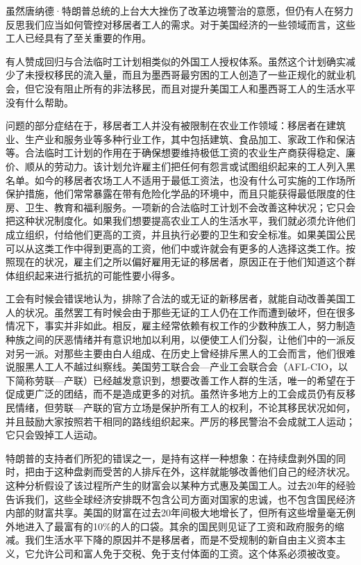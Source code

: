 \documentclass[fontset=fandol, a4paper, 12pt, openright]{ctexbook}
\begin{document}
虽然唐纳德·特朗普总统的上台大大挫伤了改革边境警治的意愿，但仍有人在努力反思我们应当如何管控对移居者工人的需求。对于美国经济的一些领域而言，这些工人已经具有了至关重要的作用。

有人赞成回归与合法临时工计划相类似的外国工人授权体系。虽然这个计划确实减少了未授权移民的流入量，而且为墨西哥最穷困的工人创造了一些正规化的就业机会，但它没有阻止所有的非法移民，而且对提升美国工人和墨西哥工人的生活水平没有什么帮助。

问题的部分症结在于，移居者工人并没有被限制在农业工作领域：移居者在建筑业、生产业和服务业等多种行业工作，其中包括建筑、食品加工、家政工作和保洁等。合法临时工计划的作用在于确保想要维持极低工资的农业生产商获得稳定、廉价、顺从的劳动力。该计划允许雇主们把任何有怨言或试图组织起来的工人列入黑名单。如今的移居者农场工人不适用于最低工资法，也没有什么可实施的工作场所保护措施，他们常常暴露在带有危险化学品的环境中，而且只能获得最低限度的住房、卫生、教育和福利服务。一项新的合法临时工计划不会改善这种状况；它只会把这种状况制度化。如果我们想要提高农业工人的生活水平，我们就必须允许他们成立组织，付给他们更高的工资，并且执行必要的卫生和安全标准。如果美国公民可以从这类工作中得到更高的工资，他们中或许就会有更多的人选择这类工作。按照现在的状况，雇主们之所以偏好雇用无证的移居者，原因正在于他们知道这个群体组织起来进行抵抗的可能性要小得多。

工会有时候会错误地认为，排除了合法的或无证的新移居者，就能自动改善美国工人的状况。虽然罢工有时候会由于那些无证的工人仍在工作而遭到破坏，但在很多情况下，事实并非如此。相反，雇主经常依赖有权工作的少数种族工人，努力制造种族之间的厌恶情绪并有意识地加以利用，以便使工人们分裂，让他们中的一派反对另一派。对那些主要由白人组成、在历史上曾经排斥黑人的工会而言，他们很难说服黑人工人不越过纠察线。美国劳工联合会—产业工会联合会（AFL-CIO，以下简称劳联—产联）已经越发意识到，想要改善工作人群的生活，唯一的希望在于促成更广泛的团结，而不是造成更多的对抗。虽然许多地方上的工会成员仍有反移民情绪，但劳联—产联的官方立场是保护所有工人的权利，不论其移民状况如何，并且鼓励大家按照若干相同的路线组织起来。严厉的移民警治不会成就工人运动；它只会毁掉工人运动。

特朗普的支持者们所犯的错误之一，是持有这样一种想象：在持续盘剥外国的同时，把由于这种盘剥而受苦的人排斥在外，这样就能够改善他们自己的经济状况。这种分析假设了该过程所产生的财富会以某种方式惠及美国工人。过去20年的经验告诉我们，这些全球经济安排既不包含公司方面对国家的忠诚，也不包含国民经济内部的财富共享。美国的财富在过去20年间极大地增长了，但所有这些增量毫无例外地进入了最富有的10\%的人的口袋。其余的国民则见证了工资和政府服务的缩减。我们生活水平下降的原因并不是移居者，而是不受规制的新自由主义资本主义，它允许公司和富人免于交税、免于支付体面的工资。这个体系必须被改变。
\end{document}
